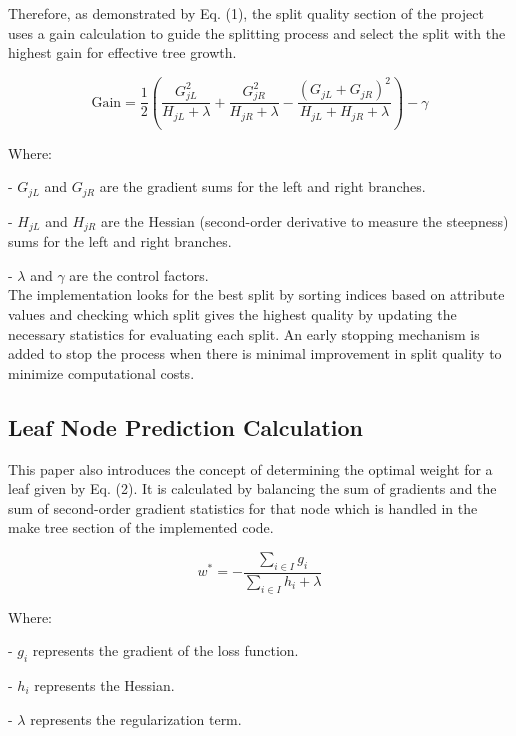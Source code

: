 \documentclass{article}
\begin{document}
Therefore, as demonstrated by Eq. (1), the split quality section of the project uses a gain calculation \cite{chen2016xgboost} to guide the splitting process and select the split with the highest gain for effective tree growth.

\begin{equation}
\text{Gain} = \frac{1}{2} \left( \frac{G_{jL}^2}{H_{jL} + \lambda} + \frac{G_{jR}^2}{H_{jR} + \lambda} - \frac{(G_{jL} + G_{jR})^2}{H_{jL} + H_{jR} + \lambda} \right) - \gamma
\end{equation}

Where:

- \( G_{jL} \) and \( G_{jR} \) are the gradient sums for the left and right branches.

- \( H_{jL} \) and \( H_{jR} \) are the Hessian (second-order derivative to measure the steepness) sums for the left and right branches.

- \( \lambda \) and \( \gamma \) are the control factors.\\


The implementation looks for the best split by sorting indices based on attribute values and checking which split gives the highest quality by updating the necessary statistics for evaluating each split. An early stopping mechanism is added to stop the process when there is minimal improvement in split quality to minimize computational costs.

\subsection{Leaf Node Prediction Calculation}
This paper\cite{chen2016xgboost} also introduces the concept of determining the optimal weight for a leaf given by Eq. (2). It is calculated by balancing the sum of gradients and the sum of second-order gradient statistics for that node which is handled in the make tree section of the implemented code. 

\begin{equation}
w^* = - \frac{\sum_{i \in I} g_i}{\sum_{i \in I} h_i + \lambda}
\end{equation}

Where:

- \( g_i \) represents the gradient of the loss function.

- \( h_i \) represents the Hessian.

- \( \lambda \) represents the regularization term.
\end{document}
